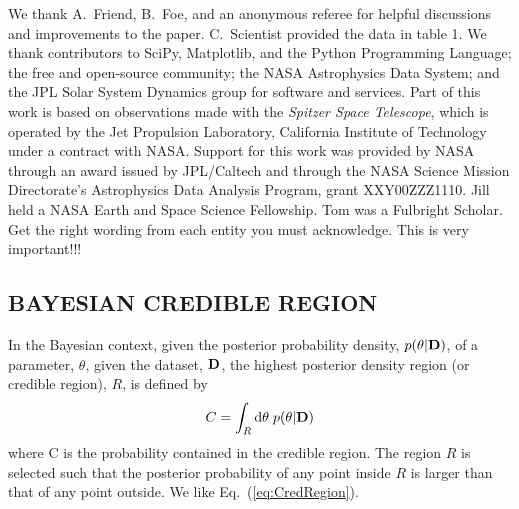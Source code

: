 \acknowledgments

We thank A.\ Friend, B.\ Foe, and an anonymous referee for helpful
discussions and improvements to the paper.  C.\ Scientist provided the
data in table 1.
We thank contributors to SciPy, Matplotlib, and the Python Programming
Language; the free and open-source community; the NASA Astrophysics
Data System; and the JPL Solar System Dynamics group for software and
services.
Part of this work is based on observations made with the
{\em Spitzer Space Telescope}, which is operated by the Jet Propulsion
Laboratory, California Institute of Technology under a contract with
NASA.
Support for this work was provided by NASA through an award
issued by JPL/Caltech and through the NASA Science Mission
Directorate's Astrophysics Data Analysis Program, grant
XXY00ZZZ1110.
Jill held a NASA Earth and Space Science Fellowship.  Tom was a
Fulbright Scholar.  Get the right wording from each entity you must
acknowledge.  This is very important!!!



\begin{appendices}

\section{BAYESIAN CREDIBLE REGION}
\label{sec:CredRegion}

In the Bayesian context, given the posterior probability density,
$p(\theta|{\bf D})$, of a parameter, $\theta$, given the dataset,
${\bf D}$, the highest posterior density region (or credible
region), $R$, is defined by
\begin{equation}
C = \int\sb{R} {\rm d}\theta\;p(\theta|{\bf D})
\label{eq:CredRegion}
\end{equation}
where C is the probability contained in the credible region.  The
region $R$ is selected such that the posterior probability of any
point inside $R$ is larger than that of any point outside.  We like
Eq.\ (\ref{eq:CredRegion}).

\end{appendices}


